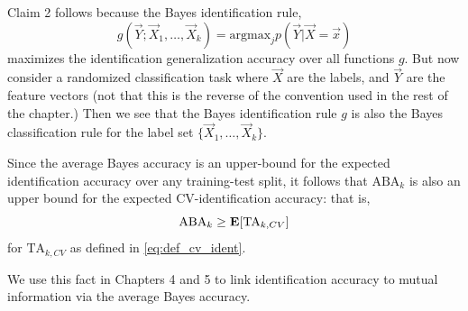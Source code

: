 Claim 2 follows because the Bayes identification rule,
\[
g(\vec{Y}; \vec{X}_1,\hdots, \vec{X}_k) = \text{argmax}_j p(\vec{Y}|\vec{X} = \vec{x})
\]
maximizes the identification generalization accuracy over all
functions $g$.  But now consider a randomized classification task
where $\vec{X}$ are the labels, and $\vec{Y}$ are the feature vectors
(not that this is the reverse of the convention used in the rest of
the chapter.)  Then we see that the Bayes identification rule $g$ is
also the Bayes classification rule for the label set $\{\vec{X}_1,
\hdots, \vec{X}_k\}$.

Since the average Bayes accuracy is an upper-bound for the expected
identification accuracy over any training-test split, it follows that
$\text{ABA}_k$ is also an upper bound for the expected
CV-identification accuracy: that is,
\begin{equation}\label{eq:aba_cv_ident_bound}
\text{ABA}_k \geq \textbf{E}[\text{TA}_{k, CV}]
\end{equation}
for $\text{TA}_{k, CV}$ as defined in \eqref{eq:def_cv_ident}.

We use this fact in Chapters 4 and 5 to link identification accuracy
to mutual information via the average Bayes accuracy.
